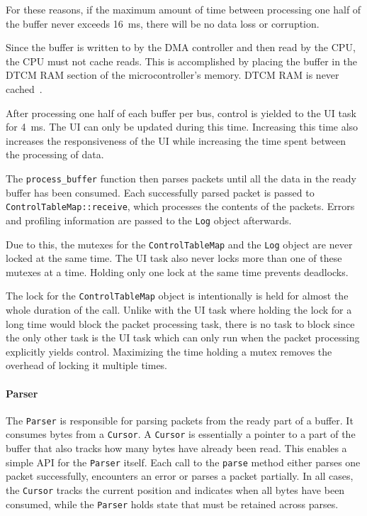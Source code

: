 For these reasons, if the maximum amount of time between processing one half of the buffer never
exceeds \SI{16}{\milli\second}, there will be no data loss or corruption.

Since the buffer is written to by the DMA controller and then read by the CPU, the CPU must not cache
reads. This is accomplished by placing the buffer in the DTCM RAM section of the microcontroller's
memory. DTCM RAM is never cached~\cite{mcu-ref-manual}.

After processing one half of each buffer per bus, control is yielded to the UI task for \SI{4}{\milli\second}.
The UI can only be updated during this time. Increasing this time also increases the responsiveness
of the UI while increasing the time spent between the processing of data.

The \lstinline{process_buffer} function then parses packets until all the data in the ready buffer
has been consumed. Each successfully parsed packet is passed to \lstinline{ControlTableMap::receive},
which processes the contents of the packets. Errors and profiling information are passed to the
\lstinline{Log} object afterwards.

Due to this, the mutexes for the \lstinline{ControlTableMap} and the \lstinline{Log} object are
never locked at the same time. The UI task also never locks more than one of these mutexes at a time.
Holding only one lock at the same time prevents deadlocks.

The lock for the \lstinline{ControlTableMap} object is intentionally is held for almost the whole
duration of the call. Unlike with the UI task where holding the lock for a long time would block
the packet processing task, there is no task to block since the only other task is the UI task which
can only run when the packet processing explicitly yields control. Maximizing the time holding a
mutex removes the overhead of locking it multiple times.

\paragraph{Parser}

The \lstinline{Parser} is responsible for parsing packets from the ready part of a buffer. It
consumes bytes from a \mbox{\lstinline{Cursor}.} A \lstinline{Cursor} is essentially a pointer to
a part of the buffer that also tracks how many bytes have already been read. This enables a simple
API for the \lstinline{Parser} itself. Each call to the \lstinline{parse} method either parses one
packet successfully, encounters an error or parses a packet partially. In all cases, the \lstinline{Cursor}
tracks the current position and indicates when all bytes have been consumed, while the \lstinline{Parser}
holds state that must be retained across parses.

